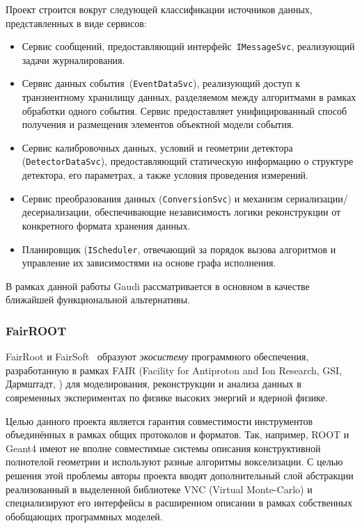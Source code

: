 Проект строится вокруг следующей классификации
источников данных, представленных в виде сервисов:
\begin{itemize}
    \item Сервис сообщений, предоставляющий
    интерфейс~\texttt{IMessageSvc}, реализующий задачи
    журналирования.
    
    \item Сервис данных события~(\texttt{EventDataSvc}),
    реализующий доступ к транзиентному хранилищу данных,
    разделяемом между алгоритмами в рамках обработки одного
    события. Сервис предоставляет унифицированный
    способ получения и размещения элементов объектной модели
    события.

    \item Сервис калибровочных данных, условий и геометрии
    детектора (\texttt{DetectorDataSvc}), предоставляющий
    статическую информацию о структуре детектора, его
    параметрах, а также условия проведения
    измерений.

    \item Сервис преобразования данных (\texttt{ConversionSvc}) и
    механизм сериализации/десериализации, обеспечивающие независимость
    логики реконструкции от конкретного формата хранения данных.

    \item Планировщик (\texttt{IScheduler},
    отвечающий за порядок вызова алгоритмов и управление
    их зависимостями на основе графа исполнения.
\end{itemize}

В рамках данной работы Gaudi рассматривается в основном
в качестве ближайшей функциональной альтернативы.

\subsubsection{FairROOT}

FairRoot и FairSoft~\cite{fairroot-AlTurany-2012} образуют
\emph{экосистему} программного обеспечения, разработанную
в рамках FAIR (Facility for Antiproton and Ion Research,
GSI, Дармштадт, \cite{FAIR-techreport}) для моделирования,
реконструкции и анализа данных в современных экспериментах по
физике высоких энергий и ядерной физике.

Целью данного проекта является гарантия совместимости
инструментов объединённых в рамках общих протоколов и форматов.
Так, например, ROOT и Geant4 имеют не вполне совместимые системы
описания конструктивной полнотелой геометрии и используют
разные алгоритмы вокселизации. С целью решения этой проблемы
авторы проекта вводят дополнительный слой абстракции реализованный
в выделенной библиотеке VNC (Virtual Monte-Carlo) и специализируют
его интерфейсы в расширенном описании в рамках собственных обобщающих
программных моделей.


